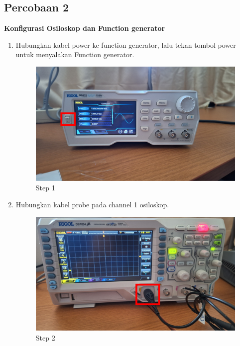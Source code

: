 \subsection{Percobaan 2}
\begin{center}

	\textbf{Konfigurasi Osiloskop dan Function generator}
	\begin{enumerate}
		\item Hubungkan kabel power ke function generator, lalu tekan tombol power untuk menyalakan Function generator.
		      \begin{figure}[H]
			      \centering
			      \includegraphics[width=0.8\linewidth]{P1/img/per 2/step 1.png}
			      \caption{Step 1}
			      \label{fig:Step 1(Group 7)}
		      \end{figure}

		\item Hubungkan kabel probe pada channel 1 osiloskop.
		      \begin{figure}[H]
			      \centering
			      \includegraphics[width=0.8\linewidth]{P1/img/per 2/step 2.png}
			      \caption{Step 2}
			      \label{fig:Step 2(Group 8)}
		      \end{figure}


\end{enumerate}
\end{center}
